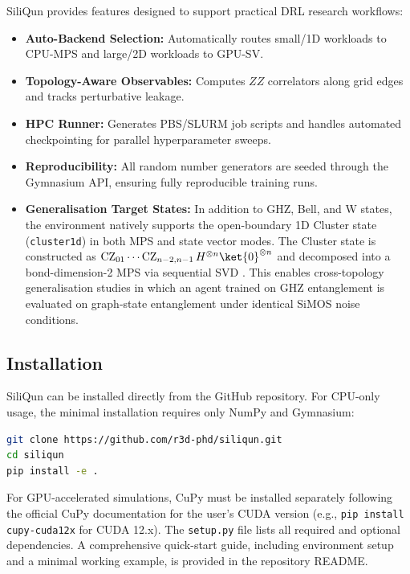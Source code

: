 \documentclass[preprint,12pt, a4paper]{elsarticle}
\begin{document}
SiliQun provides features designed to support practical DRL research workflows:
\begin{itemize}
    \item \textbf{Auto-Backend Selection:} Automatically routes small/1D workloads to CPU-MPS and large/2D workloads to GPU-SV.
    \item \textbf{Topology-Aware Observables:} Computes $ZZ$ correlators along grid edges and tracks perturbative leakage.
    \item \textbf{HPC Runner:} Generates PBS/SLURM job scripts and handles automated checkpointing for parallel hyperparameter sweeps.
    \item \textbf{Reproducibility:} All random number generators are seeded through the Gymnasium API, ensuring fully reproducible training runs.
    \item \textbf{Generalisation Target States:} In addition to GHZ, Bell, and W states, the environment natively supports the open-boundary 1D Cluster state (\texttt{cluster1d}) in both MPS and state vector modes. The Cluster state is constructed as $\mathrm{CZ}_{01}\cdots\mathrm{CZ}_{n-2,n-1}\,H^{\otimes n}\ket{0}^{\otimes n}$ and decomposed into a bond-dimension-2 MPS via sequential SVD \cite{verstraete2004renormalization}. This enables cross-topology generalisation studies in which an agent trained on GHZ entanglement is evaluated on graph-state entanglement under identical SiMOS noise conditions.
\end{itemize}

\subsection{Installation}

SiliQun can be installed directly from the GitHub repository. For CPU-only usage, the minimal installation requires only NumPy and Gymnasium:

\begin{lstlisting}[language=bash, basicstyle=\footnotesize\ttfamily, backgroundcolor=\color{gray!10}, frame=single]
git clone https://github.com/r3d-phd/siliqun.git
cd siliqun
pip install -e .
\end{lstlisting}

For GPU-accelerated simulations, CuPy must be installed separately following the official CuPy documentation for the user's CUDA version (e.g., \texttt{pip install cupy-cuda12x} for CUDA 12.x). The \texttt{setup.py} file lists all required and optional dependencies. A comprehensive quick-start guide, including environment setup and a minimal working example, is provided in the repository README.
\end{document}
